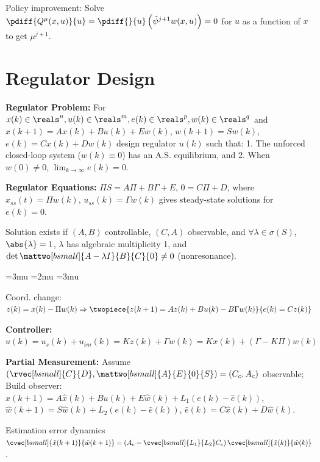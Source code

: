 \documentclass[twocolumn, 8pt]{extarticle}
\newenvironment{tight}
  {\begingroup
   \setlength{\arraycolsep}{2pt}
   \thinmuskip=3mu       %
   \medmuskip=2mu        %
   \thickmuskip=3mu      %
  }
  {
    \endgroup
  }
\begin{document}
Policy improvement: Solve $\pdiff{Q^\mu(x, u)}{u} = \pdiff{}{u}\left(\hat\psi^{j + 1}w(x, u)\right) = 0$
for \(u\) as a function of \(x\) to get $\mu^{j + 1}$.

\section{Regulator Design} %

\textbf{Regulator Problem:} For $x(k) \in \reals^n, u(k) \in \reals^m, e(k) \in \reals^p, w(k) \in \reals^q$ and
\(x(k + 1) = Ax(k) + Bu(k) + Ew(k)\), \(w(k + 1) = Sw(k)\), \(e(k) = Cx(k) + Dw(k)\)
design regulator \(u(k)\) such that: 1. The unforced closed-loop system ($w(k) \equiv 0$) has an A.S. equilibrium, and
2. When $w(0) \neq 0$, $\displaystyle \lim _{k \to \infty} e(k) = 0$.

\textbf{Regulator Equations:} \(\Pi S = A\Pi + B\Gamma + E\), \(0 = C\Pi + D\), where \(x_{ss}(t) = \Pi w(k)\),
\(u_{ss}(k) = \Gamma w(k)\) gives steady-state solutions for \(e(k) = 0\).

Solution exists if \((A, B)\) controllable, \((C, A)\) observable, and \(\forall \lambda \in \sigma(S)\), \(\abs{\lambda} = 1\),
\(\lambda\) has algebraic multiplicity 1, and \(\det \mattwo[bsmall]{A - \lambda I}{B}{C}{0} \neq 0\) (nonresonance).

\begin{tight}
    Coord. change: \(z(k) = x(k) - \Pi w(k) \Rightarrow \twopiece{z(k + 1) = Az(k) + Bu(k) - B\Gamma w(k)}{e(k) = Cz(k)}\)
\end{tight}

\textbf{Controller:} \(u(k) = u_s(k) + u_{im}(k) = Kz(k) + \Gamma w(k) = Kx(k) + (\Gamma - K\Pi)w(k)\)

\textbf{Partial Measurement:} Assume \(\left(\rvec[bsmall]{C}{D}, \mattwo[bsmall]{A}{E}{0}{S}\right) = (C_c, A_c)\) observable;
Build observer: \(\hat x(k + 1) = A\hat x(k) + Bu(k) + E\hat w(k) + L_1(e(k) - \hat e(k))\),
\(\hat w(k + 1) = S\hat w(k) + L_2(e(k) - \hat e(k))\), \(\hat e(k) = C\hat x(k) + D\hat w(k)\).

Estimation error dynamics \(\cvec[bsmall]{\tilde x(k + 1)}{\tilde w(k + 1)} = \left(A_c - \cvec[bsmall]{L_1}{L_2}C_c\right)\cvec[bsmall]{\tilde x(k)}{\tilde w(k)}\).
\end{document}
